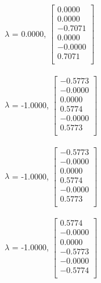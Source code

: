 \documentclass{report}
\begin{document}
        $\lambda$ = 0.0000, {$\begin{bmatrix}
                                0.0000 \\
                                0.0000 \\
                                -0.7071 \\
                                0.0000 \\
                                -0.0000 \\
                                0.7071 \\
                            \end{bmatrix}$}\\\\

        $\lambda$ = -1.0000, {$\begin{bmatrix}
                                -0.5773 \\
                                -0.0000 \\
                                0.0000 \\
                                0.5774 \\
                                -0.0000 \\
                                0.5773 \\
                            \end{bmatrix}$}\\\\

        $\lambda$ = -1.0000, {$\begin{bmatrix}
                                -0.5773 \\
                                -0.0000 \\
                                0.0000 \\
                                0.5774 \\
                                -0.0000 \\
                                0.5773 \\
                            \end{bmatrix}$}\\\\

        $\lambda$ = -1.0000, {$\begin{bmatrix}
                                0.5774 \\
                                -0.0000 \\
                                0.0000 \\
                                -0.5773 \\
                                -0.0000 \\
                                -0.5774 \\
                            \end{bmatrix}$}\\\\
                            
\end{document}
